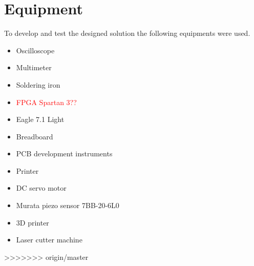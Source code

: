 	\section{Equipment}
	\label{sec:equipment}
		To develop and test the designed solution the following equipments were used.
		\begin{itemize}
			\item Oscilloscope
			\item Multimeter
			\item Soldering iron
			\item \textcolor{red}{FPGA Spartan 3??}
			\item Eagle 7.1 Light
			\item Breadboard
			\item PCB development instruments
			\item Printer
			\item DC servo motor
			\item Murata piezo sensor 7BB-20-6L0
			\item 3D printer
			\item Laser cutter machine
		\end{itemize}
>>>>>>> origin/master
